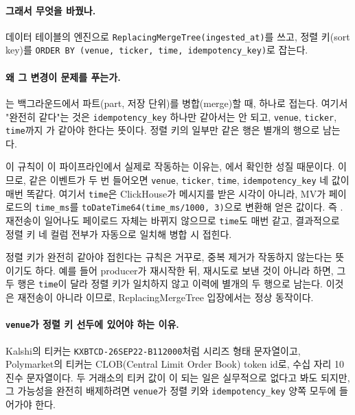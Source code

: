 \paragraph{그래서 무엇을 바꿨나.} 데이터 테이블의 엔진으로
\texttt{ReplacingMergeTree(ingested\_at)}를 쓰고, 정렬 키(sort key)를
\texttt{ORDER BY (venue, ticker, time, idempotency\_key)}로 잡는다.

\paragraph{왜 그 변경이 문제를 푸는가.} 는 백그라운드에서
파트(part, 저장 단위)를 병합(merge)할 때,  하나로
접는다. 여기서 "완전히 같다"는 것은 \texttt{idempotency\_key} 하나만 같아서는 안 되고,
\texttt{venue}, \texttt{ticker}, \texttt{time}까지 가 같아야
한다는 뜻이다. 정렬 키의 일부만 같은 행은 별개의 행으로 남는다.

이 규칙이 이 파이프라인에서 실제로 작동하는 이유는, 에서
확인한 성질 때문이다. 이므로, 같은 이벤트가 두 번 들어오면 \texttt{venue}, \texttt{ticker},
\texttt{time}, \texttt{idempotency\_key} 네 값이 매번 똑같다. 여기서 \texttt{time}은
ClickHouse가 메시지를 받은 시각이 아니라, MV가 페이로드의 \texttt{time\_ms}를
\texttt{toDateTime64(time\_ms/1000, 3)}으로 변환해 얻은 값이다. 즉 . 재전송이 일어나도 페이로드 자체는 바뀌지 않으므로 \texttt{time}도
매번 같고, 결과적으로 정렬 키 네 컬럼 전부가 자동으로 일치해 병합 시 접힌다.

\begin{callout}
정렬 키가 완전히 같아야 접힌다는 규칙은 거꾸로,  중복 제거가 작동하지 않는다는 뜻이기도
하다. 예를 들어 producer가 재시작한 뒤, 재시도로 보낸 것이 아니라 하면, 그 두 행은 \texttt{time}이
달라 정렬 키가 일치하지 않고 이력에 별개의 두 행으로 남는다. 이것은 재전송이 아니라
이므로, ReplacingMergeTree 입장에서는 정상 동작이다.
\end{callout}

\paragraph{\texttt{venue}가 정렬 키 선두에 있어야 하는 이유.} Kalshi의 티커는
\texttt{KXBTCD-26SEP22-B112000}처럼 시리즈 형태 문자열이고, Polymarket의 티커는
CLOB(Central Limit Order Book) token id로, 수십 자리 10진수 문자열이다. 두 거래소의
티커 값이 이 되는 일은 실무적으로 없다고 봐도 되지만, 그
가능성을 완전히 배제하려면 \texttt{venue}가 정렬 키와 \texttt{idempotency\_key} 양쪽
모두에 들어가야 한다.

